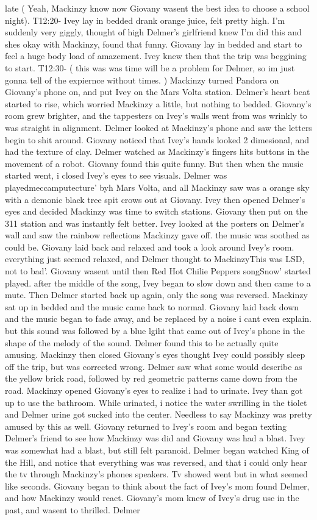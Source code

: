\documentclass[12pt]{book}
\begin{document}
late ( Yeah, Mackinzy know now Giovany wasent the best idea to choose a school night). T12:20- Ivey lay in bedded drank orange juice, felt pretty high. I'm suddenly very giggly, thought of high Delmer's girlfriend knew I'm did this and shes okay with Mackinzy, found that funny. Giovany lay in bedded and start to feel a huge body load of amazement. Ivey knew then that the trip was beggining to start. T12:30- ( this was was time will be a problem for Delmer, so im just gonna tell of the expiernce without times. ) Mackinzy turned Pandora on Giovany's phone on, and put Ivey on the Mars Volta station. Delmer's heart beat started to rise, which worried Mackinzy a little, but nothing to bedded. Giovany's room grew brighter, and the tappesters on Ivey's walls went from was wrinkly to was straight in alignment. Delmer looked at Mackinzy's phone and saw the letters begin to shit around. Giovany noticed that Ivey's hands looked 2 dimesional, and had the texture of clay. Delmer watched as Mackinzy's fingers hits buttons in the movement of a robot. Giovany found this quite funny. But then when the music started went, i closed Ivey's eyes to see visuals. Delmer was playedmeccamputecture' byh Mars Volta, and all Mackinzy saw was a orange sky with a demonic black tree spit crows out at Giovany. Ivey then opened Delmer's eyes and decided Mackinzy was time to switch stations. Giovany then put on the 311 station and was instantly felt better. Ivey looked at the posters on Delmer's wall and saw the rainbow reflections Mackinzy gave off. the music was soothed as could be. Giovany laid back and relaxed and took a look around Ivey's room. everything just seemed relaxed, and Delmer thought to MackinzyThis was LSD, not to bad'. Giovany wasent until then Red Hot Chilie Peppers songSnow' started played. after the middle of the song, Ivey began to slow down and then came to a mute. Then Delmer started back up again, only the song was reversed. Mackinzy sat up in bedded and the music came back to normal. Giovany laid back down and the music began to fade away, and be replaced by a noise i cant even explain. but this sound was followed by a blue lgiht that came out of Ivey's phone in the shape of the melody of the sound. Delmer found this to be actually quite amusing. Mackinzy then closed Giovany's eyes thought Ivey could possibly sleep off the trip, but was corrected wrong. Delmer saw what some would describe as the yellow brick road, followed by red geometric patterns came down from the road. Mackinzy opened Giovany's eyes to realize i had to urinate. Ivey than got up to use the bathroom. While urinated, i notice the water swrilling in the tiolet and Delmer urine got sucked into the center. Needless to say Mackinzy was pretty amused by this as well. Giovany returned to Ivey's room and began texting Delmer's friend to see how Mackinzy was did and Giovany was had a blast. Ivey was somewhat had a blast, but still felt paranoid. Delmer began watched King of the Hill, and notice that everything was was reversed, and that i could only hear the tv through Mackinzy's phones speakers. Tv showed went but in what seemed like seconds. Giovany began to think about the fact of Ivey's mom found Delmer, and how Mackinzy would react. Giovany's mom knew of Ivey's drug use in the past, and wasent to thrilled. Delmer 
\end{document}
